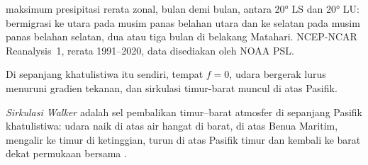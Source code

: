 \begin{omfigure}

{\small {} maksimum presipitasi rerata zonal, bulan demi bulan, antara \ang{20} LS dan \ang{20} LU:  bermigrasi ke utara pada musim panas belahan utara dan ke selatan pada musim panas belahan selatan, dua atau tiga bulan di belakang Matahari. NCEP-NCAR Reanalysis~1, rerata 1991--2020, data disediakan oleh NOAA PSL.}
\label{fig:b1:atmospheric-circulation:itcz}
\end{omfigure}

Di sepanjang khatulistiwa itu sendiri, tempat $f = 0$, udara bergerak lurus menuruni gradien tekanan, dan sirkulasi timur-barat muncul di atas Pasifik.

\begin{definition}\label{def:b1:atmospheric-circulation:walker}
\emph{Sirkulasi Walker} adalah sel pembalikan timur--barat atmosfer di sepanjang Pasifik khatulistiwa: udara naik di atas air hangat di barat, di atas Benua Maritim, mengalir ke timur di ketinggian, turun di atas Pasifik timur dan kembali ke barat dekat permukaan bersama .
\end{definition}

